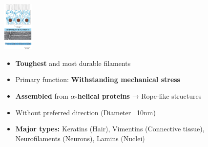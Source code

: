 \begin{minipage}{0.15\linewidth}
    \includegraphics[width=15mm]{src/Images/interm_fil.png}
\end{minipage}
\begin{minipage}{0.85\linewidth}
\begin{itemize}
    \item \textbf{Toughest} and most durable filaments
    \item Primary function: \textbf{Withstanding mechanical stress}
    \item \textbf{Assembled} from \textbf{$\alpha$-helical proteins} → Rope-like structures
    \item Without preferred direction (Diameter ~10nm)
    \item \textbf{Major types:} Keratins (Hair), Vimentins (Connective tissue), Neurofilaments (Neurons), Lamins (Nuclei)
\end{itemize}
\end{minipage}